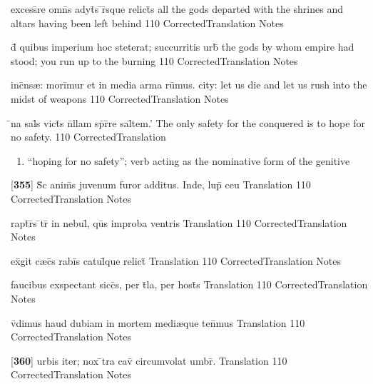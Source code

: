 \latline
  {excess\={}re omn\={}s adyt\={\macron {\i}}s \={}r\={\macron {\i}}sque relict\={\macron {\i}}s}
  { all the gods departed with the shrines and altars having been left behind }
  {110}
  { CorrectedTranslation }
  { Notes }


\latline
  {d\={\macron {\i}} quibus imperium hoc steterat; succurritis urb\={\macron {\i}}}
  { the gods by whom empire had stood; you run up to the burning  }
  {110}
  { CorrectedTranslation }
  { Notes }


\latline
  {inc\={}ns{\ae}: mori\={}mur et in media arma ru\={}mus.}
  { city: let us die and let us rush into the midst of weapons }
  {110}
  { CorrectedTranslation }
  { Notes }


\latline
  {\={}na sal\={}s vict\={\macron {\i}}s n\={}llam sp\={}r\={}re sal\={}tem.'}
  { The only safety for the conquered is to hope for no safety. }
  {110}
  { CorrectedTranslation }
  { \begin{enumerate}
  	\item ``hoping for no safety''; verb acting as the nominative form of the genitive
  \end{enumerate} }


\latline
  {[\textbf{355}] S\={\macron {\i}}c anim\={\macron {\i}}s juvenum furor additus.  Inde, lup\={\macron {\i}} ceu}
  { Translation }
  {110}
  { CorrectedTranslation }
  { Notes }


\latline
  {rapt\={}r\={}s \={}tr\={} in nebul\={}, qu\={}s improba ventris}
  { Translation }
  {110}
  { CorrectedTranslation }
  { Notes }


\latline
  {ex\={}git c{\ae}c\={}s rabi\={}s catul\={\macron {\i}}que relict\={\macron {\i}}}
  { Translation }
  {110}
  { CorrectedTranslation }
  { Notes }


\latline
  {faucibus exspectant sicc\={\macron {\i}}s, per t\={}la, per host\={\macron {\i}}s}
  { Translation }
  {110}
  { CorrectedTranslation }
  { Notes }


\latline
  {v\={}dimus haud dubiam in mortem medi{\ae}que ten\={}mus}
  { Translation }
  {110}
  { CorrectedTranslation }
  { Notes }


\latline
  {[\textbf{360}] urbis iter; nox \={}tra cav\={} circumvolat umbr\={}.}
  { Translation }
  {110}
  { CorrectedTranslation }
  { Notes }


